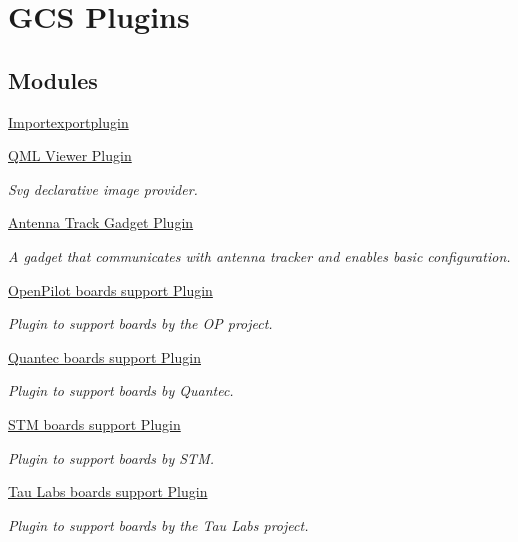 \hypertarget{group___g_c_s_plugins}{\section{G\-C\-S Plugins}
\label{group___g_c_s_plugins}
}
\subsection*{Modules}
\begin{DoxyCompactItemize}
\item 
\hyperlink{group__importexportplugin}{Importexportplugin}
\item 
\hyperlink{group___o_p_map_plugin}{Q\-M\-L Viewer Plugin}
\begin{DoxyCompactList}\small\item\em Svg declarative image provider. \end{DoxyCompactList}\item 
\hyperlink{group___antenna_track_gadget_plugin}{Antenna Track Gadget Plugin}
\begin{DoxyCompactList}\small\item\em A gadget that communicates with antenna tracker and enables basic configuration. \end{DoxyCompactList}\item 
\hyperlink{group___boards___open_pilot_plugin}{Open\-Pilot boards support Plugin}
\begin{DoxyCompactList}\small\item\em Plugin to support boards by the O\-P project. \end{DoxyCompactList}\item 
\hyperlink{group___boards___quantec}{Quantec boards support Plugin}
\begin{DoxyCompactList}\small\item\em Plugin to support boards by Quantec. \end{DoxyCompactList}\item 
\hyperlink{group___boards___stm}{S\-T\-M boards support Plugin}
\begin{DoxyCompactList}\small\item\em Plugin to support boards by S\-T\-M. \end{DoxyCompactList}\item 
\hyperlink{group___boards___tau_labs_plugin}{Tau Labs boards support Plugin}
\begin{DoxyCompactList}\small\item\em Plugin to support boards by the Tau Labs project. \end{DoxyCompactList}\item 

\end{DoxyCompactItemize}
